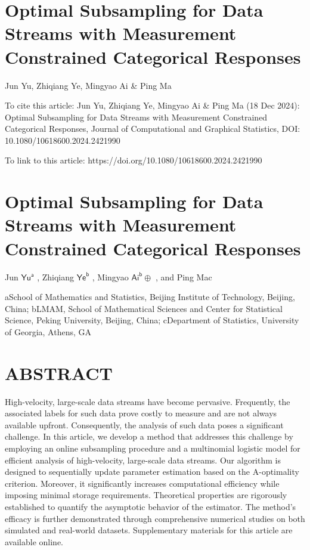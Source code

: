 \documentclass[
  10
]{article}
\author{}
\date{}
\begin{document}
\section{Optimal Subsampling for Data Streams with Measurement
Constrained Categorical
Responses}\label{optimal-subsampling-for-data-streams-with-measurement-constrained-categorical-responses}

Jun Yu, Zhiqiang Ye, Mingyao Ai \& Ping Ma

To cite this article: Jun Yu, Zhiqiang Ye, Mingyao Ai \& Ping Ma (18 Dec
2024): Optimal Subsampling for Data Streams with Measurement Constrained
Categorical Responses, Journal of Computational and Graphical
Statistics, DOI: 10.1080/10618600.2024.2421990

To link to this article: https://doi.org/10.1080/10618600.2024.2421990

\section{Optimal Subsampling for Data Streams with Measurement
Constrained Categorical
Responses}\label{optimal-subsampling-for-data-streams-with-measurement-constrained-categorical-responses-1}

Jun \(\mathsf { Y u ^ { a } }\) , Zhiqiang
\(\mathsf { Y e } ^ { \mathsf { b } }\) , Mingyao
\(\mathsf { A i } ^ { \mathsf { b } } \oplus\) , and Ping Mac

aSchool of Mathematics and Statistics, Beijing Institute of Technology,
Beijing, China; bLMAM, School of Mathematical Sciences and Center for
Statistical Science, Peking University, Beijing, China; cDepartment of
Statistics, University of Georgia, Athens, GA

\section{ABSTRACT}\label{abstract}

High-velocity, large-scale data streams have become pervasive.
Frequently, the associated labels for such data prove costly to measure
and are not always available upfront. Consequently, the analysis of such
data poses a significant challenge. In this article, we develop a method
that addresses this challenge by employing an online subsampling
procedure and a multinomial logistic model for efficient analysis of
high-velocity, large-scale data streams. Our algorithm is designed to
sequentially update parameter estimation based on the A-optimality
criterion. Moreover, it significantly increases computational efficiency
while imposing minimal storage requirements. Theoretical properties are
rigorously established to quantify the asymptotic behavior of the
estimator. The method's efficacy is further demonstrated through
comprehensive numerical studies on both simulated and real-world
datasets. Supplementary materials for this article are available online.
\end{document}
